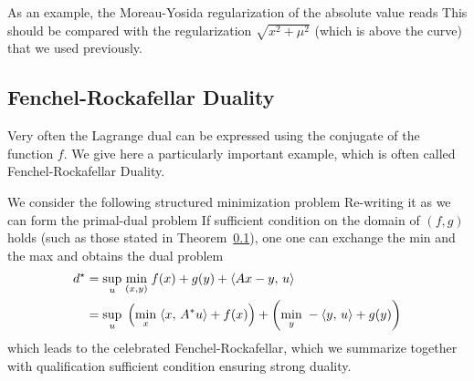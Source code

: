 As an example, the Moreau-Yosida regularization of the absolute value reads
This should be compared with the regularization $\sqrt{x^2+\mu^2}$ (which is above the curve) that we used previously. 



\subsection{Fenchel-Rockafellar Duality}


Very often the Lagrange dual can be expressed using the conjugate of the function $f$. We give here a particularly important example, which is often called Fenchel-Rockafellar Duality. 

We consider the following structured minimization problem
Re-writing it as 
we can form the primal-dual problem
If sufficient condition on the domain of $(f,g)$ holds (such as those stated in Theorem~\ref{}), one one can exchange the min and the max and obtains the dual problem
\begin{align}\label{eq-deriv-rock-fench}
	d^\star &= \underset{u}{\sup}\; \underset{(x,y)}{\min}\; f(x) + g(y) + \langle Ax-y,\,u\rangle \\
	&= \underset{u}{\sup}\; \left(  \underset{x}{\min}\; \langle x,\,A^* u\rangle + f(x)  \right) + \left(  \underset{y}{\min}\; -\langle y,\,u\rangle + g(y)  \right) 
\end{align}
which leads to the celebrated Fenchel-Rockafellar, which we summarize together with qualification sufficient condition ensuring strong duality.

